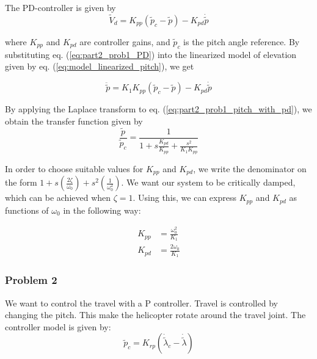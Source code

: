 The PD-controller is given by
\begin{equation} \label{eq:part2_prob1_PD}
    \tilde{V}_d = K_{pp} (\tilde{p}_c - \tilde{p}) - K_{pd} \dot{\tilde{p}}
\end{equation}

where $K_{pp}$ and $K_{pd}$ are controller gains, and $\tilde{p}_c$ is the pitch angle reference. By substituting eq. (\ref{eq:part2_prob1_PD}) into the linearized model of elevation given by eq. (\ref{eq:model_linearized_pitch}), we get

\begin{equation} \label{eq:part2_prob1_pitch_with_pd}
    \ddot{\tilde p} = K_1 K_{pp} (\tilde{p}_c - \tilde{p}) - K_{pd} \dot{\tilde{p}}
\end{equation}

By applying the Laplace transform to eq. (\ref{eq:part2_prob1_pitch_with_pd}), we obtain the transfer function given by
\begin{equation}
    \frac{\tilde p}{\tilde p_c} = \frac{1}{1 + s \frac{K_{pd}}{K_{pp}} + \frac{s^2}{K_1 K_{pp}}}
\end{equation}

In order to choose suitable values for $K_{pp}$ and $K_{pd}$, we write the denominator on the form $1 + s \left(\frac{2 \zeta}{\omega_0} \right) + s^2 \left( \frac{1}{\omega_0^2} \right)$. We want our system to be critically damped, which can be achieved when $\zeta = 1$. Using this, we can express $K_{pp}$ and $K_{pd}$ as functions of $\omega_0$ in the following way:

\begin{subequations} \label{eq:part2_prob1_K}
    \begin{align}
        K_{pp} &= \frac{\omega_0^2}{K_1} \label{eq:part2_prob2_pd_1} \\
        K_{pd} &= \frac{2 \omega_0}{K_1} \label{eq:part2_prob2_pd_2}
    \end{align}
\end{subequations}




\subsubsection{Problem 2}
We want to control the travel with a P controller. Travel is controlled by changing the pitch. This make the helicopter rotate around the travel joint. The controller model is given by:
\begin{equation}
    \tilde{p}_c = K_{rp} (\dot{\tilde{\lambda}}_c - \dot{\tilde{\lambda}})
\end{equation}

